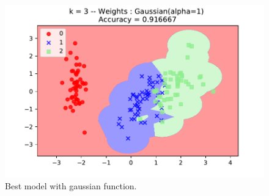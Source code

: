 \documentclass[10pt,a4paper]{article}
\begin{document}
		\begin{figure}[h]
		\centering
		\includegraphics[width=0.7\linewidth]{../Images/Best_choice_Gaussian(alpha=1)}
		\caption{Best model with gaussian function.}
		\label{fig:Best_choice_Gaussian(alpha=1)}
		\end{figure}


	
\end{document}
